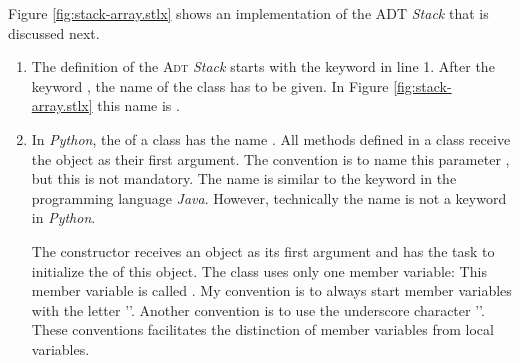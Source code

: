 Figure \ref{fig:stack-array.stlx} shows an implementation of the ADT \textsl{Stack} that is 
discussed next.
\begin{enumerate}
\item The definition of the \textsc{Adt} \textsl{Stack} starts with the keyword 
      in line 1.
      After the keyword , the name of the class has to be given.  In Figure
      \ref{fig:stack-array.stlx} this name is .
\item In \textsl{Python}, the  of a class has the name .
      All methods defined in a class receive the object as their first argument.
      The convention is to name this parameter , but this is not mandatory.
      The name  is similar to the keyword  in the programming language
      \textsl{Java}.  However, technically the name  is not a keyword in \textsl{Python}.
      
      The constructor receives an  object as its first argument and has the task
      to initialize the  of this object.  The class  uses only one member variable:
      This member variable is called .  My convention is to always start member
      variables with the letter ''.  Another convention is to use the underscore character
      '\mytt{\_}'.  These conventions facilitates the distinction of member variables from local variables.


\end{enumerate}

